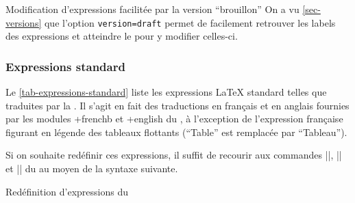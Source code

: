 \begin{dbremark}{Modification d'expressions facilitée par la version
    \enquote{brouillon}}{}
  On a vu \vref{sec-versions} que l'option
  \lstinline[deletekeywords={version}]|version=draft| permet de facilement
  retrouver les labels des expressions et atteindre le \File{\configurationfile}
  pour y modifier celles-ci.
\end{dbremark}

\subsubsection{Expressions standard}
\label{sec-expressions-standard}%
%

Le \vref{tab-expressions-standard} liste les expressions \LaTeX{} standard
telles que traduites par la \yatCl{}. Il s'agit en fait des traductions en
français et en anglais fournies par les modules \package*+{frenchb} et
\package*+{english} du , à l'exception de l'expression française
figurant en légende des tableaux flottants (\enquote{Table} est remplacée par
\enquote{Tableau}).%
%

Si on souhaite redéfinir ces expressions, il suffit de recourir aux commandes
|\addto|, |\captionsfrench| et |\captionsenglish| du  au moyen
de la syntaxe suivante.

\begin{preamblecode}[title=Par exemple dans le \File{\configurationfile}]
\addto{}
\addto{}
\end{preamblecode}
\begin{table}[hb]
  \centering
  \caption{Valeurs et commandes d'expressions \LaTeX{} standard fournies par la \yatCl{}}
  \label{tab-expressions-standard}
  
\end{table}
%
\begin{dbexample}{Redéfinition d'expressions du }{}
\begin{preamblecode}[title=Redéfinition des expressions pour les résumés]
\addto{}
\addto{}
\end{preamblecode}
\end{dbexample}

